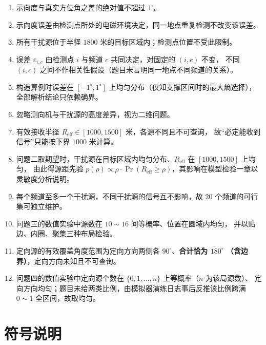 \documentclass[withoutpreface, bwprint]{cumcmthesis}
\begin{document}
\begin{enumerate}[label=(\arabic*), itemsep=0pt]
  \item 示向度与真实方位角之差的绝对值不超过 $1^\circ$。
  \item 示向度误差由检测点所处的电磁环境决定，同一地点重复检测不改变该误差。
  \item 所有干扰源位于半径 $1800$ 米的目标区域内；检测点位置不受此限制。
  \item 误差 $\varepsilon_{i,c}$ 由检测点 $i$ 与频道 $c$ 共同决定，对固定的 $(i,c)$ 不变，
        不同 $(i,c)$ 之间不作相关性假设（题目未言明同一地点不同频道的关系）。
  \item 构造算例时误差在 $[-1^\circ,1^\circ]$ 上均匀分布（仅知支撑区间时的最大熵选择），
        全部解析结论只依赖确界。
  \item 忽略测向机与干扰源的高度差异，视为二维问题。
  \item 有效接收半径 $R_{\mathrm{eff}}\in[1000,1500]$ 米，各源不同且不可查询，
        故“必定能收到信号”只能按下界 $1000$ 米计算。
  \item 问题二取期望时，干扰源在目标区域内均匀分布、$R_{\mathrm{eff}}$ 在 $[1000,1500]$ 上均匀，
        由此得源距先验 $p(\rho)\propto\rho\cdot\Pr(R_{\mathrm{eff}}\ge\rho)$，其影响在模型检验一章以灵敏度分析说明。
  \item 每个频道至多一个干扰源，不同干扰源的信号互不影响，故 $20$ 个频道的可行集可独立维护。
  \item 问题三的数值实验中源数在 $10\sim16$ 间等概率、位置在圆域内均匀，
        并以贴边、内圈、聚集三种布局检验。
  \item 定向源的有效覆盖角度范围为定向方向两侧各 $90^\circ$、\textbf{合计恰为 $180^\circ$
        （含边界）}，定向方向未知且不可查询。
  \item 问题四的数值实验中定向源个数在 $\{0,1,\ldots,n\}$ 上等概率（$n$ 为该局源数）、
        定向方向均匀；题目未给两类比例，由模拟器演练日志事后反推该比例跨满 $0\sim1$ 全区间，故取均匀。
\end{enumerate}

\section{符号说明}
\end{document}
